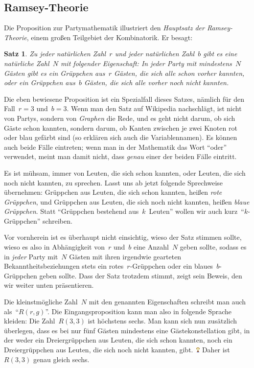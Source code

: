 \documentclass{../../zirkelblatt1718}
\theoremstyle{definition}
\theoremstyle{plain}
\newtheorem{satz}[defn]{Satz}
\theoremstyle{remark}
\newcommand{\happy}{\includegraphics[height=0.7em]{happy}\xspace}
\begin{document}
\subsection{Ramsey-Theorie}

Die Proposition zur Partymathematik illustriert den \emph{Hauptsatz der
Ramsey-Theorie}, einem großen Teilgebiet der Kombinatorik. Er besagt:

\begin{satz}Zu jeder natürlichen Zahl~$r$ und jeder natürlichen Zahl~$b$ gibt
es eine natürliche Zahl~$N$ mit folgender Eigenschaft: In jeder Party mit
mindestens~$N$ Gästen gibt es ein Grüppchen aus~$r$ Gästen, die sich alle schon
vorher kannten, oder ein Grüppchen aus~$b$ Gästen, die sich alle vorher noch
nicht kannten.
\end{satz}

Die eben bewiesene Proposition ist ein Spezialfall dieses Satzes, nämlich für
den Fall~$r = 3$ und~$b = 3$. Wenn man den Satz auf Wikipedia nachschlägt, ist
nicht von Partys, sondern von \emph{Graphen} die Rede, und es geht nicht darum,
ob sich Gäste schon kannten, sondern darum, ob Kanten zwischen je zwei Knoten
rot oder blau gefärbt sind (so erklären sich auch die Variablennamen). Es
können auch beide Fälle eintreten; wenn man in der Mathematik das Wort "`oder"'
verwendet, meint man damit nicht, dass \emph{genau} einer der beiden Fälle
eintritt.

Es ist mühsam, immer von Leuten, die sich schon kannten, oder Leuten, die sich
noch nicht kannten, zu sprechen. Lasst uns ab jetzt folgende Sprechweise
übernehmen: Grüppchen aus Leuten, die sich schon kannten, heißen \emph{rote
Grüppchen}, und Grüppchen aus Leuten, die sich noch nicht kannten, heißen
\emph{blaue Grüppchen}. Statt "`Grüppchen bestehend aus~$k$~Leuten"' wollen
wir auch kurz~"`$k$-Grüppchen"' schreiben.

Vor vornherein ist es überhaupt nicht einsichtig, wieso der Satz stimmen
sollte, wieso es also in Abhängigkeit von~$r$ und~$b$ eine Anzahl~$N$ geben
sollte, sodass es in \emph{jeder} Party mit~$N$ Gästen mit ihren irgendwie
gearteten Bekanntheitsbeziehungen stets ein rotes~$r$-Grüppchen oder ein
blaues~$b$-Grüppchen geben sollte. Dass der Satz trotzdem stimmt, zeigt sein
Beweis, den wir weiter unten präsentieren.

Die kleinstmögliche Zahl~$N$ mit den genannten Eigenschaften schreibt man auch
als~"`$R(r,g)$"'. Die Eingangsproposition kann man also in folgende Sprache
kleiden: Die Zahl~$R(3,3)$ ist höchstens sechs. Man kann sich nun zusätzlich
überlegen, dass es bei nur fünf Gästen mindestens eine Gästekonstellation gibt,
in der weder ein Dreiergrüppchen aus Leuten, die sich schon kannten, noch ein
Dreiergrüppchen aus Leuten, die sich noch nicht kannten, gibt.~\happy Daher
ist~$R(3,3)$ genau gleich sechs.
\end{document}
